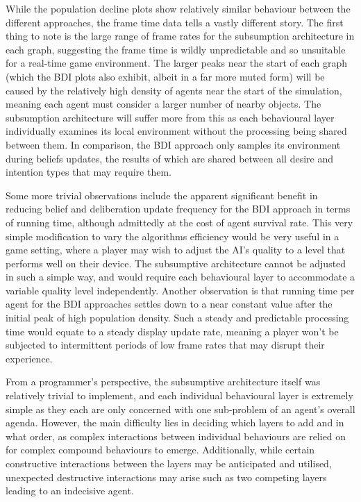 \documentclass[a4paper,12pt]{article}
\begin{document}
While the population decline plots show relatively similar behaviour between the different approaches, the frame time data tells a vastly different story. The first thing to note is the large range of frame rates for the subsumption architecture in each graph, suggesting the frame time is wildly unpredictable and so unsuitable for a real-time game environment. The larger peaks near the start of each graph (which the BDI plots also exhibit, albeit in a far more muted form) will be caused by the relatively high density of agents near the start of the simulation, meaning each agent must consider a larger number of nearby objects. The subsumption architecture will suffer more from this as each behavioural layer individually examines its local environment without the processing being shared between them. In comparison, the BDI approach only samples its environment during beliefs updates, the results of which are shared between all desire and intention types that may require them.

Some more trivial observations include the apparent significant benefit in reducing belief and deliberation update frequency for the BDI approach in terms of running time, although admittedly at the cost of agent survival rate. This very simple modification to vary the algorithms efficiency would be very useful in a game setting, where a player may wish to adjust the AI's quality to a level that performs well on their device. The subsumptive architecture cannot be adjusted in such a simple way, and would require each behavioural layer to accommodate a variable quality level independently. Another observation is that running time per agent for the BDI approaches settles down to a near constant value after the initial peak of high population density. Such a steady and predictable processing time would equate to a steady display update rate, meaning a player won't be subjected to intermittent periods of low frame rates that may disrupt their experience.

From a programmer's perspective, the subsumptive architecture itself was relatively trivial to implement, and each individual behavioural layer is extremely simple as they each are only concerned with one sub-problem of an agent's overall agenda. However, the main difficulty lies in deciding which layers to add and in what order, as complex interactions between individual behaviours are relied on for complex compound behaviours to emerge. Additionally, while certain constructive interactions between the layers may be anticipated and utilised, unexpected destructive interactions may arise such as two competing layers leading to an indecisive agent.
\end{document}
